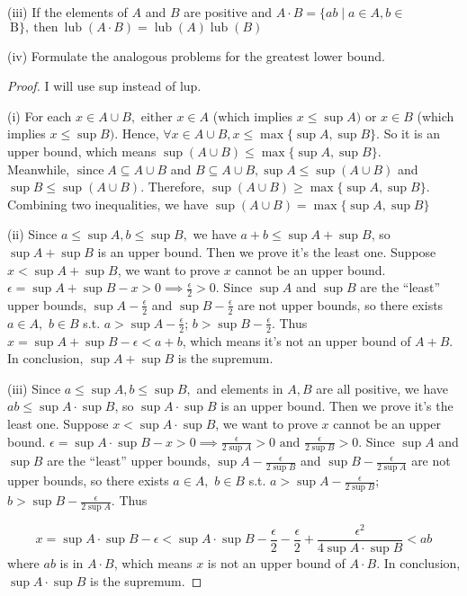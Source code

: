\documentclass[12pt]{article}
\theoremstyle{definition}
\numberwithin{equation}{subsection}
\begin{document}
(iii) If the elements of $A$ and $B$ are positive and $A \cdot B=\{a b \mid a \in A, b \in$
$\mathrm{~ B \} , ~ t h e n ~} \operatorname{lub}(A \cdot B)=\operatorname{lub}(A) \operatorname{lub}(B)$

(iv) Formulate the analogous problems for the greatest lower bound.
\begin{proof}
    I will use sup instead of lup.

(i) For each \(x \in A \cup B, \text { either } x \in A \) (which implies \( x \leq \sup A) \text { or } x \in B \) (which implies \( x \leq \sup B)\). Hence, $\forall x \in A \cup B, x \leq \max\{\sup A,\sup B\}$. So it is an upper bound, which means $\sup (A \cup B) \leq \max \{\sup A, \sup B\}$.
\\Meanwhile, \(\operatorname{since} A \subseteq A \cup B\) and \(B \subseteq A \cup B, \sup A \leq \sup (A \cup B)\) and \(\sup B \leq \sup (A \cup B)\). Therefore, \(\sup (A \cup B) \geq \max \{\sup A, \sup B\}\).
\\Combining two inequalities, we have \(\sup (A \cup B) = \max \{\sup A, \sup B\}\)

(ii) Since \(a \leq \sup A, b \leq \sup B,\) we have \(a+b \leq \sup A +\sup B\), so $\sup A +\sup B$ is an upper bound. Then we prove it's the least one. Suppose $x < \sup A +\sup B$, we want to prove $x$ cannot be an upper bound. $\epsilon = \sup A +\sup B - x > 0 \implies \frac{\epsilon}{2} > 0$. Since $\sup A$ and $\sup B$ are the ``least'' upper bounds, $\sup A - \frac{\epsilon}{2}$ and $\sup B - \frac{\epsilon}{2}$ are not upper bounds, so there exists $a \in A,$ $b \in B$ s.t. $a > \sup A - \frac{\epsilon}{2}$; $b > \sup B - \frac{\epsilon}{2}$. Thus $x = \sup A + \sup B - \epsilon < a + b$, which means it's not an upper bound of $A+B$. In conclusion, $\sup A +\sup B$ is the supremum.

(iii) Since
\(a \leq \sup A, b \leq \sup B,\)
and elements in $A, B$ are all positive,
we have \(ab \leq \sup A \cdot \sup B\), so $\sup A \cdot\sup B$ is an upper bound. Then we prove it's the least one.
Suppose $x < \sup A \cdot\sup B$, we want to prove $x$ cannot be an upper bound. $\epsilon = \sup A \cdot\sup B - x > 0 \implies \frac{\epsilon}{2\sup A} > 0 \text{ and } \frac{\epsilon}{2\sup B} > 0$. Since $\sup A$ and $\sup B$ are the ``least'' upper bounds,
$\sup A - \frac{\epsilon}{2\sup B}$ and $\sup B - \frac{\epsilon}{2\sup A}$ are not upper bounds, so there exists $a \in A,$ $b \in B$ s.t. $a > \sup A - \frac{\epsilon}{2\sup B}$; $b > \sup B - \frac{\epsilon}{2\sup A}$. Thus

$$x = \sup A \cdot \sup B - \epsilon < \sup A \cdot \sup B - \frac{\epsilon}{2} - \frac{\epsilon}{2} + \frac{\epsilon^2}{4\sup A \cdot \sup B} < ab$$ where $ab$ is in $A \cdot B$, which means $x$ is not an upper bound of $A \cdot B$. In conclusion, $\sup A \cdot \sup B$ is the supremum.

\end{proof}
\end{document}
